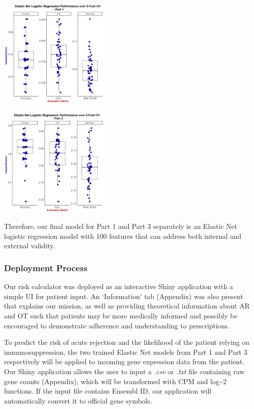 \documentclass[a4paper,9pt,twocolumn,twoside,]{pinp}
\begin{document}
\begin{center}\includegraphics[width=200px]{images/part1elastic} \end{center}

\begin{center}\includegraphics[width=200px]{images/part3elastic} \end{center}

Therefore, our final model for Part 1 and Part 3 separately is an
Elastic Net logistic regression model with 100 features that can address
both internal and external validity.

\hypertarget{deployment-process}{%
\subsubsection{Deployment Process}\label{deployment-process}}

Our risk calculator was deployed as an interactive Shiny application
with a simple UI for patient input. An `Information' tab (Appendix) was
also present that explains our mission, as well as providing theoretical
information about AR and OT such that patients may be more medically
informed and possibly be encouraged to demonstrate adherence and
understanding to prescriptions.

To predict the risk of acute rejection and the likelihood of the patient
relying on immunosuppression, the two trained Elastic Net models from
Part 1 and Part 3 respectively will be applied to incoming gene
expression data from the patient. Our Shiny application allows the user
to input a \emph{.csv} or \emph{.txt} file containing raw gene counts
(Appendix), which will be transformed with CPM and log\textasciitilde{}2
functions. If the input file contains Ensembl ID, our application will
automatically convert it to official gene symbols.
\end{document}
